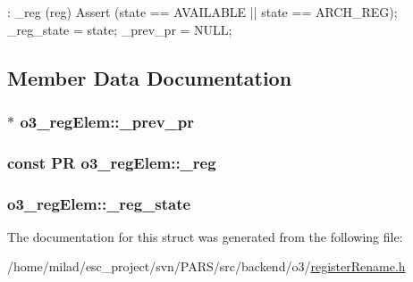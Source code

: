 \begin{DoxyCode}
        : _reg (reg)
    {
        Assert (state == AVAILABLE || state == ARCH_REG);
        _reg_state = state;
        _prev_pr = NULL;
    }
\end{DoxyCode}


\subsection{Member Data Documentation}
\hypertarget{structo3__regElem_adf5c32b447e15a5df8b1f51fbc8921f4}{
\subsubsection[{\_\-prev\_\-pr}]{$\ast$ {\bf o3\_\-regElem::\_\-prev\_\-pr}}}
\label{structo3__regElem_adf5c32b447e15a5df8b1f51fbc8921f4}
\hypertarget{structo3__regElem_aeaba0b876f3f04eca64288cc229706a4}{
\subsubsection[{\_\-reg}]{\setlength{\rightskip}{0pt plus 5cm}const {\bf PR} {\bf o3\_\-regElem::\_\-reg}}}
\label{structo3__regElem_aeaba0b876f3f04eca64288cc229706a4}
\hypertarget{structo3__regElem_af75174fd00fb8b24f4a47edf10b2e97a}{
\subsubsection[{\_\-reg\_\-state}]{ {\bf o3\_\-regElem::\_\-reg\_\-state}}}
\label{structo3__regElem_af75174fd00fb8b24f4a47edf10b2e97a}


The documentation for this struct was generated from the following file:\begin{DoxyCompactItemize}
\item 
/home/milad/esc\_\-project/svn/PARS/src/backend/o3/\hyperlink{backend_2o3_2registerRename_8h}{registerRename.h}\end{DoxyCompactItemize}
